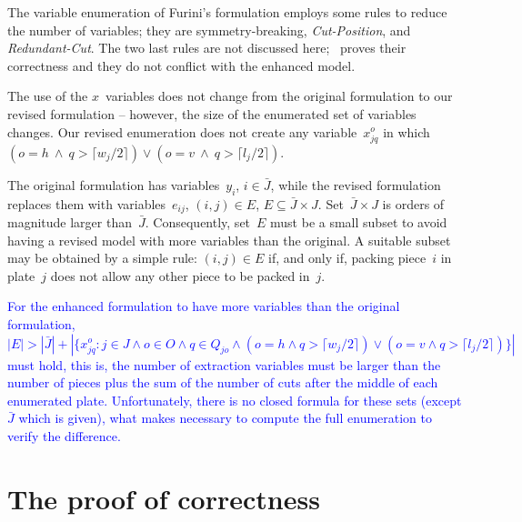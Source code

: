\documentclass[ppgc,tese,english,formais,babel]{iiufrgs}
\newif\iffinalversion
\newcommand{\newtext}[1]{\iffinalversion%
#1%
\else%
\textcolor{blue}{#1}%
\fi%
}
\begin{document}
The variable enumeration of Furini's formulation employs some rules to reduce the number of variables; they are symmetry-breaking, \emph{Cut-Position}, and \emph{Redundant-Cut}.
The two last rules are not discussed here; \citet{furini:2016}~proves their correctness and they do not conflict with the enhanced model.

The use of the \(x\)~variables does not change from the original formulation to our revised formulation -- however, the size of the enumerated set of variables changes.
Our revised enumeration does not create any variable~\(x^o_{jq}\) in which \((o = h~\land~q > \lceil w_j / 2 \rceil) \lor (o = v~\land~q > \lceil l_j / 2 \rceil)\).

The original formulation has variables~\(y_i\), \(i \in \bar{J}\), while the revised formulation replaces them with variables~\(e_{ij}\), \((i, j) \in E\), \(E \subseteq \bar{J} \times J\).
Set~\(\bar{J} \times J\) is orders of magnitude larger than~\(\bar{J}\).
Consequently, set~\(E\) must be a small subset to avoid having a revised model with more variables than the original.
A suitable subset may be obtained by a simple rule: \((i, j) \in E\) if, and only if, packing piece~\(i\) in plate~\(j\) does not allow any other piece to be packed in~\(j\).

\newtext{
For the enhanced formulation to have more variables than the original formulation, \(|E| > |\bar{J}| + |\{x^o_{jq} : j \in J \land o \in O \land q \in Q_{jo} \land (o = h \land q > \lceil w_j / 2 \rceil) \lor (o = v \land q > \lceil l_j / 2 \rceil)\}|\) must hold, this is, the number of extraction variables must be larger than the number of pieces plus the sum of the number of cuts after the middle of each enumerated plate.
Unfortunately, there is no closed formula for these sets (except \(\bar{J}\) which is given), what makes necessary to compute the full enumeration to verify the difference.
}


\section{The proof of correctness}
\end{document}
